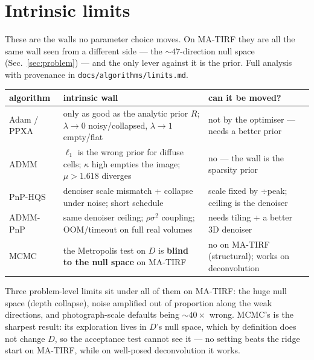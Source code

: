 \section{Intrinsic limits}
\label{sec:limits}

These are the walls no parameter choice moves. On MA-TIRF they are all the same wall seen from a
different side --- the ${\sim}47$-direction null space (Sec.~\ref{sec:problem}) --- and the only
lever against it is the prior. Full analysis with provenance in
\texttt{docs/algorithms/limits.md}.

\begin{center}
\begin{tabular}{p{2.1cm}p{6.2cm}p{4.6cm}}
\toprule
algorithm & intrinsic wall & can it be moved? \\
\midrule
Adam / PPXA & only as good as the analytic prior $R$; $\lambda\!\to\!0$ noisy/collapsed,
             $\lambda\!\to\!1$ empty/flat & not by the optimiser --- needs a better prior \\
ADMM        & $\ell_1$ is the wrong prior for diffuse cells; $\kappa$ high empties the image;
             $\mu>1.618$ diverges & no --- the wall is the sparsity prior \\
PnP-HQS     & denoiser scale mismatch + collapse under noise; short schedule & scale fixed by
             $\div$peak; ceiling is the denoiser \\
ADMM-PnP    & same denoiser ceiling; $\rho\sigma^2$ coupling; OOM/timeout on full real volumes
            & needs tiling + a better 3D denoiser \\
MCMC        & the Metropolis test on $D$ is \textbf{blind to the null space} on MA-TIRF & no on
             MA-TIRF (structural); works on deconvolution \\
\bottomrule
\end{tabular}
\end{center}

\noindent Three problem-level limits sit under all of them on MA-TIRF: the huge null space (depth
collapse), noise amplified out of proportion along the weak directions, and photograph-scale
defaults being ${\sim}40\times$ wrong. MCMC's is the sharpest result: its exploration lives in
$D$'s null space, which by definition does not change $D$, so the acceptance test cannot see it
--- no setting beats the ridge start on MA-TIRF, while on well-posed deconvolution it works.
